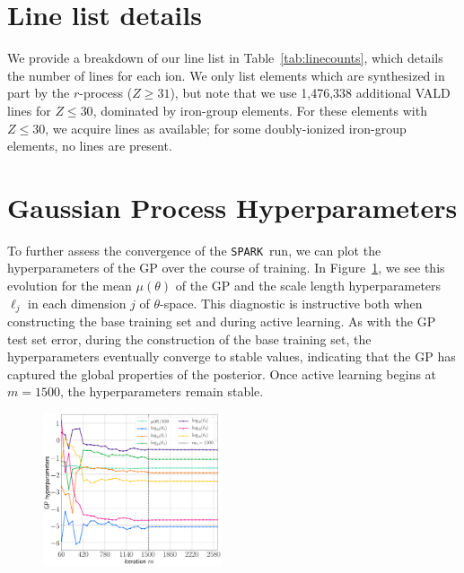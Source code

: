 \documentclass[twocolumn, twocolappendix]{aastex63}
\def\SPARK{\texttt{SPARK}}
\begin{document}
\section{Line list details}\label{app:linelist}

We provide a breakdown of our line list in Table~\ref{tab:linecounts}, which details the number of lines for each ion. We only list elements which are synthesized in part by the $r$-process ($Z \geqslant 31$), but note that we use 1,476,338 additional VALD lines for $Z \leqslant 30$, dominated by iron-group elements. For these elements with $Z \leqslant 30$, we acquire lines as available; for some doubly-ionized iron-group elements, no lines are present.


\section{Gaussian Process Hyperparameters}\label{app:GP_hparams}

To further assess the convergence of the \SPARK~run, we can plot the hyperparameters of the GP over the course of training. In Figure~\ref{fig:hparams}, we see this evolution for the mean $\mu(\theta)$ of the GP and the scale length hyperparameters $\ell_j$ in each dimension $j$ of $\theta$-space. This diagnostic is instructive both when constructing the base training set and during active learning. As with the GP test set error, during the construction of the base training set, the hyperparameters eventually converge to stable values, indicating that the GP has captured the global properties of the posterior. Once active learning begins at $m = 1500$, the hyperparameters remain stable.


\begin{figure}[!ht]
    \centering
    \includegraphics[width=0.47\textwidth]{figs/appendix/220808_014638_GP_hparams.png}
    \label{fig:hparams}
\end{figure}
\end{document}
